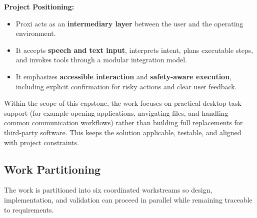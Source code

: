 \documentclass[12pt]{article}
\begin{document}
\textbf{Project Positioning:}
\begin{itemize}
  \item Proxi acts as an \textbf{intermediary layer} between the user
  and the operating environment.
  \item It accepts \textbf{speech and text input}, interprets intent,
  plans executable steps, and invokes tools through a modular
  integration model.
  \item It emphasizes \textbf{accessible interaction} and
  \textbf{safety-aware execution}, including explicit confirmation for
  risky actions and clear user feedback.
\end{itemize}

Within the scope of this capstone, the work focuses on practical
desktop task support (for example opening applications, navigating
files, and handling common communication workflows) rather than
building full replacements for third-party software. This keeps the
solution applicable, testable, and aligned with project constraints.

\subsection{Work Partitioning}
The work is partitioned into six coordinated workstreams so design,
implementation, and validation can proceed in parallel while remaining
traceable to requirements.
\end{document}
